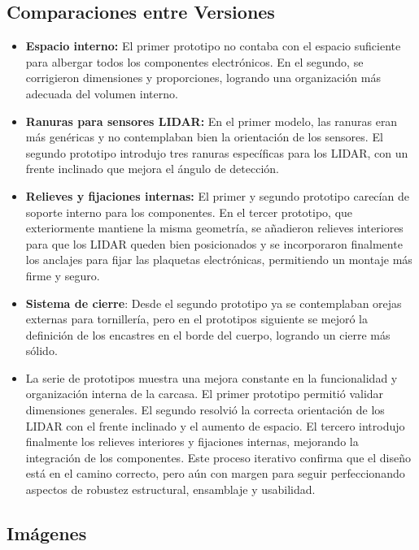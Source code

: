\documentclass[12pt,a4paper]{article}
\begin{document}
\subsection{Comparaciones entre Versiones}
\begin{itemize}
\item \textbf{Espacio interno:} El primer prototipo no contaba con el espacio suficiente para albergar todos los componentes electrónicos. En el segundo, se corrigieron dimensiones y proporciones, logrando una organización más adecuada del volumen interno.
\item \textbf{Ranuras para sensores LIDAR:} En el primer modelo, las ranuras eran más genéricas y no contemplaban bien la orientación de los sensores. El segundo prototipo introdujo tres ranuras específicas para los LIDAR, con un frente inclinado que mejora el ángulo de detección.
\item \textbf{Relieves y fijaciones internas:} El primer y segundo prototipo carecían de soporte interno para los componentes. En el tercer prototipo, que exteriormente mantiene la misma geometría, se añadieron relieves interiores para que los LIDAR queden bien posicionados y se incorporaron finalmente los anclajes para fijar las plaquetas electrónicas, permitiendo un montaje más firme y seguro.
\item \textbf{Sistema de cierre}: Desde el segundo prototipo ya se contemplaban orejas externas para tornillería, pero en el prototipos siguiente se mejoró la definición de los encastres en el borde del cuerpo, logrando un cierre más sólido.
\item La serie de prototipos muestra una mejora constante en la funcionalidad y organización interna de la carcasa. El primer prototipo permitió validar dimensiones generales. El segundo resolvió la correcta orientación de los LIDAR con el frente inclinado y el aumento de espacio. El tercero introdujo finalmente los relieves interiores y fijaciones internas, mejorando la integración de los componentes. Este proceso iterativo confirma que el diseño está en el camino correcto, pero aún con margen para seguir perfeccionando aspectos de robustez estructural, ensamblaje y usabilidad.
\end{itemize}

\subsection{Imágenes}
\end{document}
